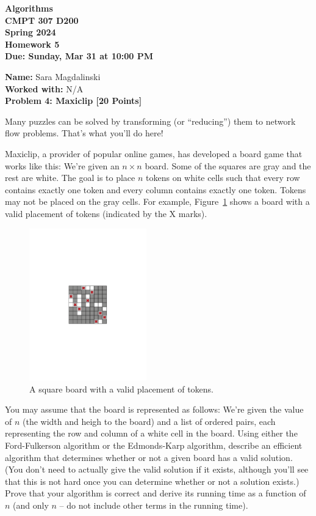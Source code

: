 \documentclass[12pt]{article}
\newcommand{\Name}[1]{\noindent \textbf{Name:} #1 \\}
\newcommand{\Workedwith}[1]{\noindent \textbf{Worked with:} #1 \\}
\newcommand{\Problem}[3]{\mbox{} \newline \noindent \textbf{\textbf{Problem #1: #2 [#3 Points] \\ }}}
\begin{document}
\begin{center}
  \bf
  Algorithms \\
  CMPT 307 D200 \\
  Spring 2024 \\
  \rm
  Homework 5\\
  Due:  Sunday, Mar 31 at 10:00 PM \\
\end{center}

\Name{Sara Magdalinski}
\Workedwith{N/A}

\Problem{4}{Maxiclip}{20}

Many puzzles can be solved by transforming (or ``reducing'') them to network flow problems.  That's what you'll do here!

Maxiclip, a provider of popular online games, has developed a board game that works like this:  We're given an $n \times n$ board.  Some of the squares are gray and the rest are white.  The goal is to place $n$ tokens on white cells such that every row contains exactly one token and every column contains exactly one token.  Tokens may not be placed on the gray cells.
For example, Figure~\ref{fig:boardgame} shows a board with a valid placement of tokens (indicated by the X marks).

\begin{figure}[h]
\begin{center}
\includegraphics[width=2in]{Board.pdf}
\end{center}
\caption{A square board with a valid placement of tokens.}
\label{fig:boardgame}
\end{figure}

You may assume that the board is represented as follows:  We're given the value of $n$ (the width and heigh to the board) and a list of ordered pairs, each representing the row and column of a white cell in the board.
Using either the Ford-Fulkerson algorithm or the Edmonds-Karp algorithm, describe an efficient algorithm that determines whether or not a given board has a valid solution.  (You don't need to actually give the valid solution if it exists, although you'll see that this is not hard once you can determine whether or not a solution exists.)  Prove that your algorithm is correct and derive its running time as a function of $n$ (and only $n$ -- do not include other terms in the running time).
\end{document}
